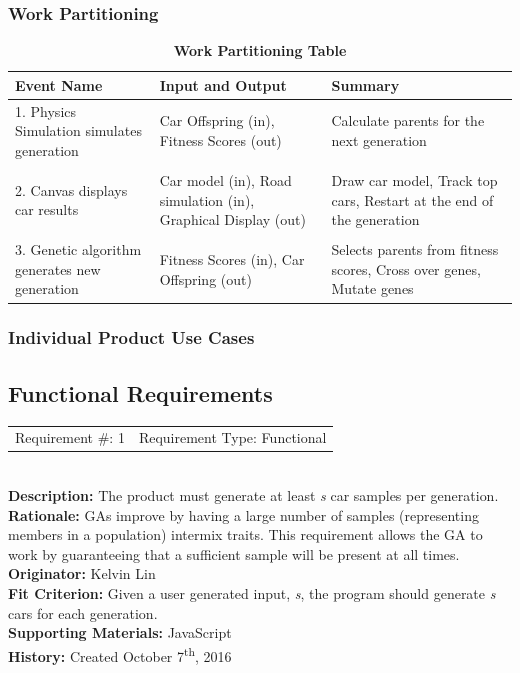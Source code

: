 \documentclass[12pt, titlepage]{article}
\begin{document}
\subsubsection{Work Partitioning}
\begin{table}[H]
\begin{tabularx}{\textwidth}{p{4cm}p{4cm}X}
\toprule {\bf Event Name} & {\bf Input and Output} & {\bf Summary}\\
\midrule
1. Physics Simulation simulates generation & Car Offspring (in), Fitness Scores (out) & Calculate parents for the next generation\\
& & \\
2. Canvas displays car results & Car model (in), Road simulation (in), Graphical Display (out) & Draw car model, Track top cars, Restart at the end of the generation\\
& & \\
3. Genetic algorithm generates new generation & Fitness Scores (in), Car Offspring (out) & Selects parents from fitness scores, Cross over genes, Mutate genes\\
\bottomrule
\end{tabularx}
\caption{\bf Work Partitioning Table}
\end{table}

\subsubsection{Individual Product Use Cases}

\newpage
\subsection{Functional Requirements}


\begin{reqbox}
%
\begin{tabular}{cc}
Requirement \#: 1 & Requirement Type: Functional \\
\end{tabular} \\
%
\textbf{Description:} The product must generate at least \textit{s} car samples 
per generation. \\
\textbf{Rationale:}  GAs improve by having a large number of samples 
(representing members in a population) intermix traits. This requirement allows 
the GA to work by guaranteeing that a sufficient sample will be present at all 
times.\\
\textbf{Originator:} Kelvin Lin\\
\textbf{Fit Criterion:} Given a user generated input, \textit{s}, the program 
should generate \textit{s} cars for each generation.\\
%  
\textbf{Supporting Materials:} JavaScript \\
\textbf{History:} Created October 7\textsuperscript{th}, 2016
%
\end{reqbox}
\end{document}
